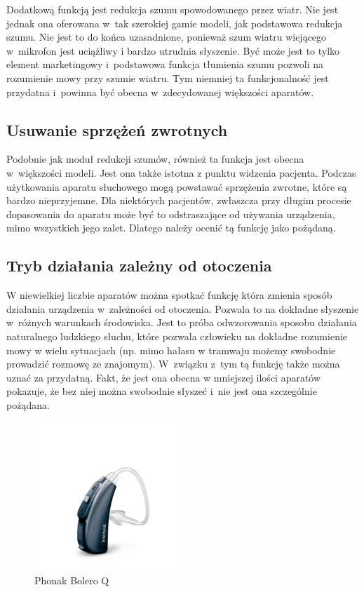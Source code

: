 \documentclass[journal,11pt]{IEEEtran}
\begin{document}
Dodatkową funkcją jest redukcja szumu spowodowanego przez wiatr. Nie jest
jednak ona oferowana w~tak szerokiej gamie modeli, jak podstawowa redukcja
szumu. Nie jest to do końca uzasadnione, ponieważ szum wiatru wiejącego
w~mikrofon jest uciążliwy i bardzo utrudnia słyszenie. Być może jest to tylko
element marketingowy i~podstawowa funkcja tłumienia szumu pozwoli na rozumienie
mowy przy szumie wiatru. Tym niemniej ta funkcjonalność jest przydatna
i~powinna być obecna w~zdecydowanej większości aparatów.

\subsection{Usuwanie sprzężeń zwrotnych}

Podobnie jak moduł redukcji szumów, również ta funkcja jest obecna w~większości
modeli. Jest ona także istotna z punktu widzenia pacjenta. Podczas użytkowania
aparatu słuchowego mogą powstawać sprzężenia zwrotne, które są bardzo
nieprzyjemne. Dla niektórych pacjentów, zwłaszcza przy długim procesie
dopasowania do aparatu może być to odstraszające od używania urządzenia, mimo
wszystkich jego zalet. Dlatego należy ocenić tą funkcję jako pożądaną.

\subsection{Tryb działania zależny od otoczenia}

W niewielkiej liczbie aparatów można spotkać funkcję która zmienia sposób
działania urządzenia w~zależności od otoczenia. Pozwala to na dokładne
słyszenie w~różnych warunkach środowiska. Jest to próba odwzorowania sposobu
działania naturalnego ludzkiego słuchu, które pozwala człowieku na dokładne
rozumienie mowy w wielu sytuacjach (np. mimo hałasu w tramwaju możemy swobodnie
prowadzić rozmowę ze znajomym). W~związku z~tym tą funkcję także można uznać za
przydatną. Fakt, że jest ona obecna w mniejszej ilości aparatów pokazuje, że
bez niej można swobodnie słyszeć i~nie jest ona szczególnie pożądana.

\begin{figure}
    \includegraphics[width=0.5\textwidth]{phonak}
    \caption{Phonak Bolero Q}
    \label{fig:phonak}
\end{figure}
\end{document}
